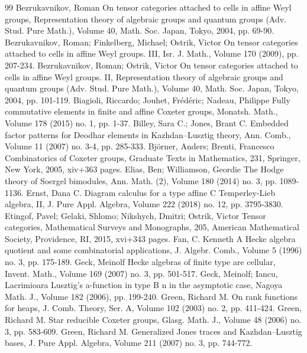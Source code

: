 \begin{thebibliography}{99}
 Bezrukavnikov, Roman On tensor categories attached to cells in affine Weyl groups, Representation theory of algebraic groups and quantum groups (Adv. Stud. Pure Math.), Volume 40, Math. Soc. Japan, Tokyo, 2004, pp. 69-90.
 Bezrukavnikov, Roman; Finkelberg, Michael; Ostrik, Victor On tensor categories attached to cells in affine Weyl groups. III, Isr. J. Math., Volume 170 (2009), pp. 207-234.
 Bezrukavnikov, Roman; Ostrik, Victor On tensor categories attached to cells in affine Weyl groups. II, Representation theory of algebraic groups and quantum groups (Adv. Stud. Pure Math.), Volume 40, Math. Soc. Japan, Tokyo, 2004, pp. 101-119.
 Biagioli, Riccardo; Jouhet, Frédéric; Nadeau, Philippe Fully commutative elements in finite and affine Coxeter groups, Monatsh. Math., Volume 178 (2015) no. 1, pp. 1-37.
 Billey, Sara C.; Jones, Brant C. Embedded factor patterns for Deodhar elements in Kazhdan–Lusztig theory, Ann. Comb., Volume 11 (2007) no. 3-4, pp. 285-333.
 Björner, Anders; Brenti, Francesco Combinatorics of Coxeter groups, Graduate Texts in Mathematics, 231, Springer, New York, 2005, xiv+363 pages.
 Elias, Ben; Williamson, Geordie The Hodge theory of Soergel bimodules, Ann. Math. (2), Volume 180 (2014) no. 3, pp. 1089-1136.
 Ernst, Dana C. Diagram calculus for a type affine C Temperley-Lieb algebra, II, J. Pure Appl. Algebra, Volume 222 (2018) no. 12, pp. 3795-3830.
 Etingof, Pavel; Gelaki, Shlomo; Nikshych, Dmitri; Ostrik, Victor Tensor categories, Mathematical Surveys and Monographs, 205, American Mathematical Society, Providence, RI, 2015, xvi+343 pages.
 Fan, C. Kenneth A Hecke algebra quotient and some combinatorial applications, J. Algebr. Comb., Volume 5 (1996) no. 3, pp. 175-189.
 Geck, Meinolf Hecke algebras of finite type are cellular, Invent. Math., Volume 169 (2007) no. 3, pp. 501-517.
 Geck, Meinolf; Iancu, Lacrimioara Lusztig’s a-function in type B n  in the asymptotic case, Nagoya Math. J., Volume 182 (2006), pp. 199-240.
 Green, Richard M. On rank functions for heaps, J. Comb. Theory, Ser. A, Volume 102 (2003) no. 2, pp. 411-424.
 Green, Richard M. Star reducible Coxeter groups, Glasg. Math. J., Volume 48 (2006) no. 3, pp. 583-609.
 Green, Richard M. Generalized Jones traces and Kazhdan–Lusztig bases, J. Pure Appl. Algebra, Volume 211 (2007) no. 3, pp. 744-772.

\end{thebibliography}
